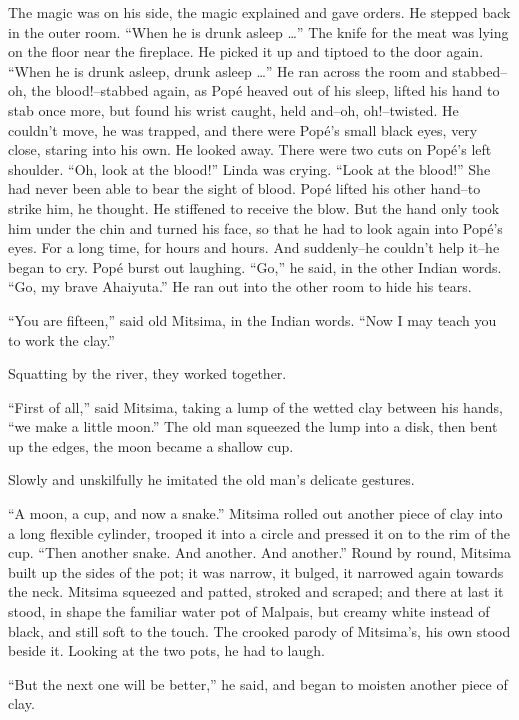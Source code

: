 \documentclass[12pt]{report}
\begin{document}
The magic was on his side, the magic explained and gave orders. He
stepped back in the outer room. ``When he is drunk asleep \ldots{}'' The
knife for the meat was lying on the floor near the fireplace. He picked
it up and tiptoed to the door again. ``When he is drunk asleep, drunk
asleep \ldots{}'' He ran across the room and stabbed--oh, the
blood!--stabbed again, as Popé heaved out of his sleep, lifted his hand
to stab once more, but found his wrist caught, held and--oh,
oh!--twisted. He couldn't move, he was trapped, and there were Popé's
small black eyes, very close, staring into his own. He looked away.
There were two cuts on Popé's left shoulder. ``Oh, look at the blood!''
Linda was crying. ``Look at the blood!'' She had never been able to bear
the sight of blood. Popé lifted his other hand--to strike him, he
thought. He stiffened to receive the blow. But the hand only took him
under the chin and turned his face, so that he had to look again into
Popé's eyes. For a long time, for hours and hours. And suddenly--he
couldn't help it--he began to cry. Popé burst out laughing. ``Go,'' he
said, in the other Indian words. ``Go, my brave Ahaiyuta.'' He ran out
into the other room to hide his tears.

``You are fifteen,'' said old Mitsima, in the Indian words. ``Now I may
teach you to work the clay.''

Squatting by the river, they worked together.

``First of all,'' said Mitsima, taking a lump of the wetted clay between
his hands, ``we make a little moon.'' The old man squeezed the lump into
a disk, then bent up the edges, the moon became a shallow cup.

Slowly and unskilfully he imitated the old man's delicate gestures.

``A moon, a cup, and now a snake.'' Mitsima rolled out another piece of
clay into a long flexible cylinder, trooped it into a circle and pressed
it on to the rim of the cup. ``Then another snake. And another. And
another.'' Round by round, Mitsima built up the sides of the pot; it was
narrow, it bulged, it narrowed again towards the neck. Mitsima squeezed
and patted, stroked and scraped; and there at last it stood, in shape
the familiar water pot of Malpais, but creamy white instead of black,
and still soft to the touch. The crooked parody of Mitsima's, his own
stood beside it. Looking at the two pots, he had to laugh.

``But the next one will be better,'' he said, and began to moisten
another piece of clay.
\end{document}
